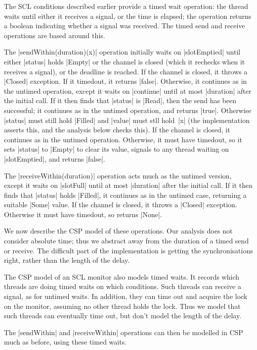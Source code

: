 The SCL conditions described earlier provide a timed wait operation: the
thread waits until either it receives a signal, or the time is elapsed; the
operation returns a boolean indicating whether a signal was received.  The
timed send and receive operations are based around this. 

The |sendWithin(duration)(x)| operation initially waits on |slotEmptied| until
either |status| holds |Empty| or the channel is closed (which it rechecks when
it receives a signal), or the deadline is reached.  If the channel is closed,
it throws a |Closed| exception.  If it timedout, it returns |false|.
Otherwise, it continues as in the untimed operation, except it waits on
|continue| until at most |duration| after the initial call.  If it then finds
that |status| is |Read|, then the send has been successful; it continues as in
the untimed operation, and returns |true|.  Otherwise |status| must still hold
|Filled| and |value| must stll hold~|x| (the implementation asserts this, and
the analysis below checks this).  If the channel is closed, it continues as in
the untimed operation.  Otherwise, it must have timedout, so it sets |status|
to |Empty| to clear its value, signals to any thread waiting on |slotEmptied|,
and returns |false|.

The |receiveWithin(duration)| operation acts much as the untimed version,
except it waits on |slotFull| until at most |duration| after the initial
call.  If it then finds that |status| holds |Filled|, it continues as in the
untimed case, returning a suitable |Some| value.  If the channel is closed, it
throws a |Closed| exception.  Otherwise it must have timedout, so returns
|None|.  


We now describe the CSP model of these operations.  Our analysis does not
consider absolute time; thus we abstract away from the duration of a timed
send or receive.  The difficult part of the implementation is getting the
synchronisations right, rather than the length of the delay. 

The CSP model of an SCL monitor also models timed waits.  It records which
threads are doing timed waits on which conditions.  Such threads can receive a
signal, as for untimed waits.  In addition, they can time out and acquire the
lock on the monitor, assuming no other thread holds the lock.  Thus we model
that such threads can eventually time out, but don't model the length of the
delay. 

The |sendWithin| and |receiveWithin| operations can then be modelled in CSP
much as before, using these timed waits.


